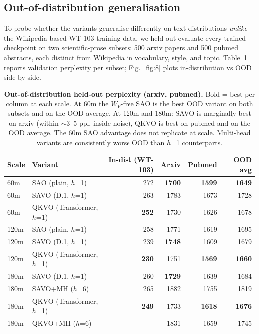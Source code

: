 \subsection{Out-of-distribution generalisation}\label{sec:5.4}

To probe whether the variants generalise differently on text distributions \emph{unlike} the Wikipedia-based
WT-103 training data, we held-out-evaluate every trained checkpoint on two scientific-prose subsets:
500 arxiv papers and 500 pubmed abstracts, each distinct from Wikipedia in vocabulary, style, and topic.
Table~\ref{tab:6} reports validation perplexity per subset; Fig.~\ref{fig:8} plots in-distribution vs OOD side-by-side.

\begin{table}[H]
\centering
\small
\renewcommand{\arraystretch}{1.2}
\begin{tabular}{llrrrr}
\toprule
Scale & Variant & In-dist (WT-103) & Arxiv & Pubmed & OOD avg \\
\midrule
60m & SAO (plain, $h$=1) & 272 & \textbf{1700} & \textbf{1599} & \textbf{1649} \\
60m & SAVO (D.1, $h$=1) & 263 & 1783 & 1673 & 1728 \\
60m & QKVO (Transformer, $h$=1) & \textbf{252} & 1730 & 1626 & 1678 \\
\midrule
120m & SAO (plain, $h$=1) & 258 & 1771 & 1619 & 1695 \\
120m & SAVO (D.1, $h$=1) & 239 & \textbf{1748} & 1609 & 1679 \\
120m & QKVO (Transformer, $h$=1) & \textbf{230} & 1751 & \textbf{1569} & \textbf{1660} \\
\midrule
180m & SAVO (D.1, $h$=1) & 260 & \textbf{1729} & 1639 & 1684 \\
180m & SAVO+MH ($h$=6) & 265 & 1882 & 1755 & 1819 \\
180m & QKVO (Transformer, $h$=1) & \textbf{249} & 1733 & \textbf{1618} & \textbf{1676} \\
180m & QKVO+MH ($h$=6) & --- & 1831 & 1659 & 1745 \\
\bottomrule
\end{tabular}
\caption{\textbf{Out-of-distribution held-out perplexity (arxiv, pubmed).} Bold = best per column at each scale. At
60m the $W_V$-free SAO is the best OOD variant on both subsets and on the OOD average. At 120m and 180m:
SAVO is marginally best on arxiv (within $\sim$3--5 ppl, inside noise), QKVO is best on pubmed and on the OOD
average. The 60m SAO advantage does not replicate at scale. Multi-head variants are consistently worse OOD
than $h$=1 counterparts.}
\label{tab:6}
\end{table}

